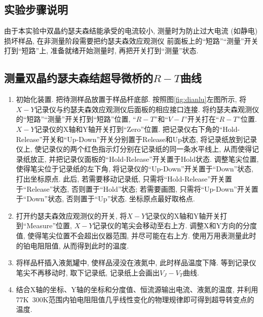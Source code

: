 \documentclass[font=default]{mpltx}
\begin{document}

\subsection{实验步骤说明}
由于本实验中双晶约瑟夫森结能承受的电流较小, 测量时为防止过大电流 (如静电) 损坏样品, 在非测量阶段需要把约瑟夫森效应观测仪 前面板上的“短路”“测量”开关打到“短路”上, 准备就绪开始测量时, 再把开关打到“测量”状态.

\subsection{测量双晶约瑟夫森结超导微桥的$R-T$曲线}
\begin{enumerate}
  \item 初始化装置. 把待测样品放置于样品杆底部. 按照图\autoref{fig:dianlu}左图所示, 将$X-Y$记录仪与约瑟夫森效应观测仪后面板的相应接口连接. 将约瑟夫森观测仪的“短路”“测量”开关打到“短路”位置, “$R-T$”和“$V-I$”开关打在“$R-T$”位置. 
  $X-Y$记录仪的X轴和Y轴开关打到“Zero”位置. 把记录仪右下角的“Hold-Release”开关和“Up-Down”开关分别置于Release和Up状态, 将记录纸放到记录仪上, 使记录仪的两个红色指示灯分别在记录纸的同一条水平线上, 从而使得记录纸放正, 并把记录仪面板的“Hold-Release”开关置于Hold状态. 
  调整笔尖位置, 使得笔尖位于记录纸的左下角, 将记录仪的“Up-Down”开关置于“Down”状态, 打出坐标原点. 此后, 若需要移动记录纸, 只需将“Hold-Release”开关置于“Release”状态, 否则置于“Hold”状态; 若需要画图, 只需将“Up-Down”开关置于“Down”状态, 否则置于“Up”状态. 坐标原点最好取格点.

  \item 打开约瑟夫森效应观测仪的开关,  将$X-Y$记录仪的X轴和Y轴开关打到“Measure”位置, $X-Y$记录仪的笔尖会移动至右上方. 调整X和Y方向的分度值, 使得笔尖位置不会超出仪器范围, 并尽可能在右上方. 使用万用表测量此时的铂电阻阻值, 从而得到此时的温度. 
  \item 将样品杆插入液氮罐中, 使样品浸没在液氮中, 此时样品温度下降. 等到记录仪笔尖不再移动时, 取下记录纸, 记录纸上会画出$V_J-V_T$曲线. 
  \item 结合X轴的坐标、Y轴的坐标和分度值、恒流源输出电流、液氮的温度, 并利用77K~300K范围内铂电阻阻值几乎线性变化的物理规律即可得到超导转变点的温度. 
\end{enumerate}
\end{document}
